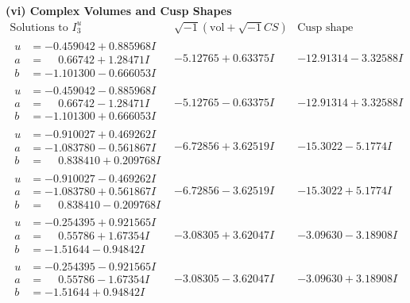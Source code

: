 \documentclass[1p]{elsarticle_modified}
\theoremstyle{definition}
\newcommand{\I}{\sqrt{-1}}
\begin{document}
\newpage\flushleft \textbf{(vi) Complex Volumes and Cusp Shapes}
$$\begin{array}{c|c|c}  
\text{Solutions to }I^u_{3}& \I (\text{vol} + \sqrt{-1}CS) & \text{Cusp shape}\\
 \hline 
\begin{aligned}
u &= -0.459042 + 0.885968 I \\
a &= \phantom{-}0.66742 + 1.28471 I \\
b &= -1.101300 - 0.666053 I\end{aligned}
 & -5.12765 + 0.63375 I & -12.91314 - 3.32588 I \\ \hline\begin{aligned}
u &= -0.459042 - 0.885968 I \\
a &= \phantom{-}0.66742 - 1.28471 I \\
b &= -1.101300 + 0.666053 I\end{aligned}
 & -5.12765 - 0.63375 I & -12.91314 + 3.32588 I \\ \hline\begin{aligned}
u &= -0.910027 + 0.469262 I \\
a &= -1.083780 - 0.561867 I \\
b &= \phantom{-}0.838410 + 0.209768 I\end{aligned}
 & -6.72856 + 3.62519 I & -15.3022 - 5.1774 I \\ \hline\begin{aligned}
u &= -0.910027 - 0.469262 I \\
a &= -1.083780 + 0.561867 I \\
b &= \phantom{-}0.838410 - 0.209768 I\end{aligned}
 & -6.72856 - 3.62519 I & -15.3022 + 5.1774 I \\ \hline\begin{aligned}
u &= -0.254395 + 0.921565 I \\
a &= \phantom{-}0.55786 + 1.67354 I \\
b &= -1.51644 - 0.94842 I\end{aligned}
 & -3.08305 + 3.62047 I & -3.09630 - 3.18908 I \\ \hline\begin{aligned}
u &= -0.254395 - 0.921565 I \\
a &= \phantom{-}0.55786 - 1.67354 I \\
b &= -1.51644 + 0.94842 I\end{aligned}
 & -3.08305 - 3.62047 I & -3.09630 + 3.18908 I \\ \hline\begin{aligned}

\end{aligned}
\end{array}$$
\end{document}
